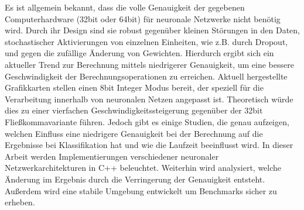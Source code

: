 Es ist allgemein bekannt, dass die volle Genauigkeit der gegebenen Computerhardware (32bit oder 64bit) für neuronale Netzwerke nicht benötig wird. Durch ihr Design sind sie robust gegenüber kleinen Störungen in den Daten, stochastischer Aktivierungen von einzelnen Einheiten, wie z.B. durch Dropout, und gegen die zufällige Änderung von Gewichten. Hierdurch ergibt sich ein aktueller Trend zur Berechnung mittels niedrigerer Genauigkeit, um eine bessere Geschwindigkeit der Berechnungsoperationen zu erreichen. Aktuell hergestellte Grafikkarten stellen einen 8bit Integer Modus bereit, der speziell für die Verarbeitung innerhalb von neuronalen Netzen angepasst ist. Theoretisch würde dies zu einer vierfachen Geschwindigkeitssteigerung gegenüber der 32bit Fließkommavariante führen. Jedoch gibt es einige Studien, die genau aufzeigen, welchen Einfluss eine niedrigere Genauigkeit bei der Berechnung auf die Ergebnisse bei Klassifikation hat und wie die Laufzeit beeinflusst wird. In dieser Arbeit werden Implementierungen verschiedener neuronaler Netzwerkarchitekturen in C++ beleuchtet. Weiterhin wird analysiert, welche Änderung im Ergebnis durch die Verringerung der Genauigkeit entsteht. Außerdem wird eine stabile Umgebung entwickelt um Benchmarks sicher zu erheben.